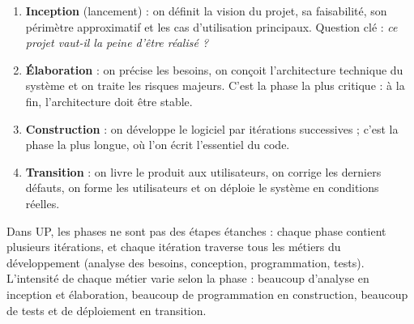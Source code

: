 \documentclass[11pt]{article}
\newcommand{\cle}[1]{{\popxbold\color{popdark}#1}}
\begin{document}
\begin{enumerate}
  \item \textbf{Inception} (lancement) : on définit la vision du projet, sa faisabilité, son périmètre approximatif et les cas d'utilisation principaux. Question clé : \emph{ce projet vaut-il la peine d'être réalisé ?}
  \item \textbf{Élaboration} : on précise les besoins, on conçoit l'architecture technique du système et on traite les risques majeurs. C'est la phase la plus critique : à la fin, l'architecture doit être stable.
  \item \textbf{Construction} : on développe le logiciel par itérations successives ; c'est la phase la plus longue, où l'on écrit l'essentiel du code.
  \item \textbf{Transition} : on livre le produit aux utilisateurs, on corrige les derniers défauts, on forme les utilisateurs et on déploie le système en conditions réelles.
\end{enumerate}

\begin{propriete}
Dans UP, les phases ne sont pas des étapes étanches : chaque phase contient plusieurs \cle{itérations}, et chaque itération traverse tous les métiers du développement (analyse des besoins, conception, programmation, tests). L'intensité de chaque métier varie selon la phase : beaucoup d'analyse en inception et élaboration, beaucoup de programmation en construction, beaucoup de tests et de déploiement en transition.
\end{propriete}
\end{document}
